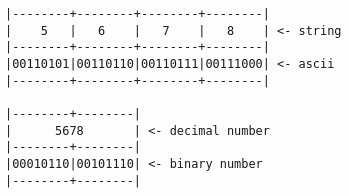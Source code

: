 \documentclass{article}
\begin{document}
\pagestyle{empty}

\begin{Verbatim}
|--------+--------+--------+--------|
|    5   |   6    |   7    |   8    | <- string
|--------+--------+--------+--------|
|00110101|00110110|00110111|00111000| <- ascii
|--------+--------+--------+--------|

|--------+--------|
|      5678       | <- decimal number
|--------+--------|
|00010110|00101110| <- binary number
|--------+--------|
\end{Verbatim}
\end{document}
